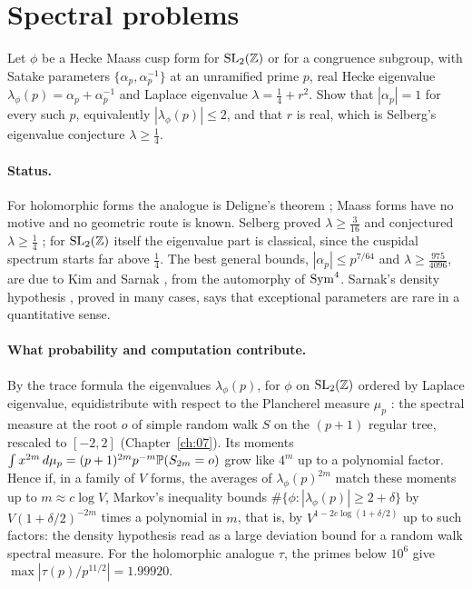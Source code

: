 \section{Spectral problems}

\begin{problem}\label{op:rp}
Let $\phi$ be a Hecke Maass cusp form for $\mathrm{SL}_2(\mathbb{Z})$ or for a congruence subgroup, with Satake parameters $\{\alpha_p,\alpha_p^{-1}\}$ at an unramified prime $p$, real Hecke eigenvalue $\lambda_\phi(p)=\alpha_p+\alpha_p^{-1}$ and Laplace eigenvalue $\lambda=\tfrac14+r^2$. Show that $|\alpha_p|=1$ for every such $p$, equivalently $|\lambda_\phi(p)|\le 2$, and that $r$ is real, which is Selberg's eigenvalue conjecture $\lambda\ge \tfrac14$.
\end{problem}

\paragraph{Status.} For holomorphic forms the analogue is Deligne's theorem \cite{deligne1974}; Maass forms have no motive and no geometric route is known. Selberg proved $\lambda\ge \tfrac{3}{16}$ and conjectured $\lambda\ge \tfrac14$ \cite{selberg1965}; for $\mathrm{SL}_2(\mathbb{Z})$ itself the eigenvalue part is classical, since the cuspidal spectrum starts far above $\tfrac14$. The best general bounds, $|\alpha_p|\le p^{7/64}$ and $\lambda\ge \tfrac{975}{4096}$, are due to Kim and Sarnak \cite{kimsarnak2003}, from the automorphy of $\operatorname{Sym}^4$. Sarnak's density hypothesis \cite{sarnakxue1991}, proved in many cases, says that exceptional parameters are rare in a quantitative sense.

\paragraph{What probability and computation contribute.} By the trace formula the eigenvalues $\lambda_\phi(p)$, for $\phi$ on $\mathrm{SL}_2(\mathbb{Z})$ ordered by Laplace eigenvalue, equidistribute with respect to the Plancherel measure $\mu_p$ \cite{sarnak1987}: the spectral measure at the root $o$ of simple random walk $S$ on the $(p+1)$ regular tree, rescaled to $[-2,2]$ (Chapter~\ref{ch:07}). Its moments $\int x^{2m}\,d\mu_p=(p+1)^{2m}p^{-m}\mathbb{P}(S_{2m}=o)$ grow like $4^m$ up to a polynomial factor. Hence if, in a family of $V$ forms, the averages of $\lambda_\phi(p)^{2m}$ match these moments up to $m\approx c\log V$, Markov's inequality bounds $\#\{\phi:|\lambda_\phi(p)|\ge2+\delta\}$ by $V(1+\delta/2)^{-2m}$ times a polynomial in $m$, that is, by $V^{1-2c\log(1+\delta/2)}$ up to such factors: the density hypothesis read as a large deviation bound for a random walk spectral measure. For the holomorphic analogue $\tau$, the primes below $10^6$ give $\max|\tau(p)/p^{11/2}|=1.99920$.

